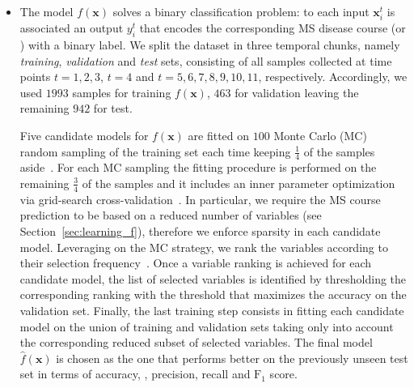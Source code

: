 \begin{itemize}
	\item[] \textbf{\F} The \F model $f(\bm{x})$ solves a binary classification problem: to each input $\bm{x}_i^t$ is associated  an output $y_i^t$ that encodes the corresponding MS disease course (\RR or \SP) with a binary label.
	We split the dataset in three temporal chunks, namely \textit{training}, \textit{validation} and \textit{test} sets, consisting of all samples collected at time points $t=1,2,3$, $t=4$ and $t=5,6,7,8,9,10,11$, respectively.
	Accordingly, we used $1993$ samples for training $f(\bm{x})$, $463$ for validation leaving the remaining $942$ for test.
	
	Five candidate models for $f(\bm{x})$ are fitted on $100$ Monte Carlo (MC) random sampling of the training set each time keeping $\frac{1}{4}$ of the samples aside~\cite{molinaro2005prediction}. For each MC sampling the fitting procedure is performed on the remaining $\frac{3}{4}$ of the samples and it includes an inner parameter optimization via grid-search cross-validation~\cite{hastie2009elements}. In particular, we require the MS course prediction to be based on a reduced number of variables (see Section~\ref{sec:learning_f}), therefore we enforce sparsity in each candidate model.
	Leveraging on the MC strategy, we rank the variables according to their selection frequency~\cite{barbieri16palladio, meinshausen2010stability}.
	Once a variable ranking is achieved for each candidate model, the list of selected variables is identified by thresholding the corresponding ranking with the threshold that maximizes the accuracy  on the validation set. Finally, the last training step consists in fitting each candidate model on the union of training and validation sets taking only into account the corresponding reduced subset of selected variables. The final \F model $\hat{f}(\bm{x})$ is chosen as the one that performs better on the previously unseen test set in terms of accuracy, , precision, recall and $\text{F}_1$ score.


\end{itemize}
